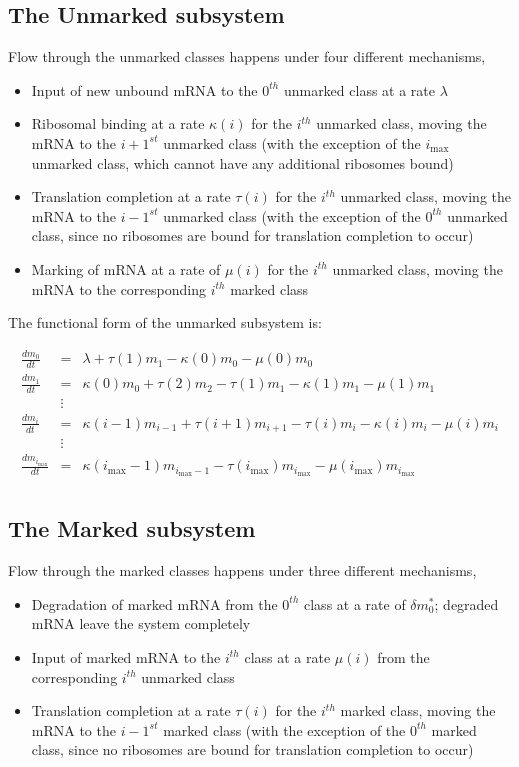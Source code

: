 \documentclass[review]{elsarticle}
\newcommand{\imax}{\ensuremath{i_{\max}}\xspace}
\begin{document}
\subsection{The Unmarked subsystem}
Flow through the unmarked classes happens under four different mechanisms,
\begin{itemize}
\item Input of new unbound mRNA to the $0^{th}$ unmarked class at a rate $\lambda$
\item Ribosomal binding at a rate $\kappa(i)$ for the $i^{th}$ unmarked class, moving the mRNA to the $i+1^{st}$ unmarked class (with the exception of the \imax unmarked class, which cannot have any additional ribosomes bound)
\item Translation completion at a rate $\tau(i)$ for the $i^{th}$ unmarked class, moving the mRNA to the $i-1^{st}$ unmarked class (with the exception of the $0^{th}$ unmarked class, since no ribosomes are bound for translation completion to occur)
\item Marking of mRNA at a rate of $\mu(i)$ for the $i^{th}$ unmarked class, moving the mRNA to the corresponding $i^{th}$ marked class
\end{itemize}

The functional form of the unmarked subsystem is:

\begin{eqnarray*}
\frac{dm_{0}}{dt} & = & \lambda+\tau(1)m_{1}-\kappa(0)m_{0}-\mu(0)m_{0} \\
\frac{dm_{1}}{dt} & = & \kappa(0)m_{0}+\tau(2)m_{2}-\tau(1)m_{1}-\kappa(1)m_{1}-\mu(1)m_{1}\\
& \vdots & \\
\frac{dm_{i}}{dt} & = & \kappa(i-1)m_{i-1}+\tau(i+1)m_{i+1}-\tau(i)m_{i}-\kappa(i)m_{i}-\mu(i)m_{i} \\
& \vdots & \\
\frac{dm_{\imax}}{dt} & = & \kappa(\imax-1)m_{\imax-1}-\tau(\imax)m_{\imax}-\mu(\imax)m_{\imax} \\
\end{eqnarray*}

\subsection{The Marked subsystem}
Flow through the marked classes happens under three different mechanisms,
\begin{itemize}
\item Degradation of marked mRNA from the $0^{th}$ class at a rate of $\delta m^*_0$; degraded mRNA leave the system completely
\item Input of marked mRNA to the $i^{th}$ class at a rate $\mu(i)$ from the corresponding $i^{th}$ unmarked class
\item Translation completion at a rate $\tau(i)$ for the $i^{th}$ marked class, moving the mRNA to the $i-1^{st}$ marked class (with the exception of the $0^{th}$ marked class, since no ribosomes are bound for translation completion to occur)
\end{itemize}
\end{document}
